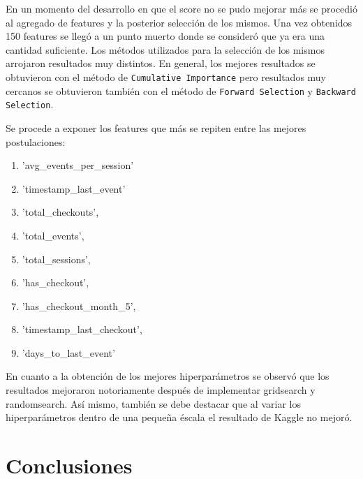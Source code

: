 \documentclass[a4paper]{article}
\begin{document}
En un momento del desarrollo en que el score no se pudo mejorar más se procedió al agregado de features y la posterior selección de los mismos. Una vez obtenidos 150 features se llegó a un punto muerto donde se consideró que ya era una cantidad suficiente. Los métodos utilizados para la selección de los mismos arrojaron resultados muy distintos. En general, los mejores resultados se obtuvieron con el método de \texttt{Cumulative Importance} pero resultados muy cercanos se obtuvieron también con el método de \texttt{Forward Selection} y \texttt{Backward Selection}. 

Se procede a exponer los features que más se repiten entre las mejores postulaciones:

\begin{enumerate}
	\item 'avg\_events\_per\_session'
	\item 'timestamp\_last\_event'
	\item 'total\_checkouts',
	\item 'total\_events',
	\item 'total\_sessions',
	\item 'has\_checkout',
	\item 'has\_checkout\_month\_5',
	\item 'timestamp\_last\_checkout',
	\item 'days\_to\_last\_event'
\end{enumerate}

En cuanto a la obtención de los mejores hiperparámetros se observó que los resultados mejoraron notoriamente después de implementar gridsearch y randomsearch. Así mismo, también se debe destacar que al variar los hiperparámetros dentro de una pequeña éscala el resultado de Kaggle no mejoró. 

\section{Conclusiones}
\end{document}
